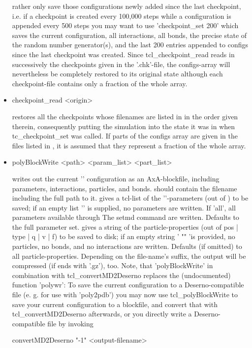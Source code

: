 \begin{itemize}
rather only save those configurations newly added since the last
checkpoint, i.e. if a checkpoint is created every 100,000 steps while
a configuration is appended every 500 steps you may want to use
'checkpoint\_set  200' which saves the current
configuration, all interactions, all bonds, the precise state of the
random number generator(s), and the last 200 entries appended to
configs since the last checkpoint was created. Since
tcl\_checkpoint\_read reads in successively the checkpoints given in
the '.chk'-file, the configs-array will nevertheless be completely
restored to its original state although each checkpoint-file contains
only a fraction of the whole array.
 \item
\begin{code}
checkpoint\_read <origin>
\end{code}

restores all the checkpoints whose filenames are listed in
 in the order given therein, consequently putting the
simulation into the state it was in when tc\_checkpoint\_set was
called. If parts of the configs array are given in the files listed in
, it is assumed that they represent a fraction of the
whole array.
 \item
\begin{code}
polyBlockWrite <path> <param\_list> <part\_list>
\end{code}
writes out the current '\es{}' configuration as an AxA-blockfile,
including parameters, interactions, particles, and bonds.  
should contain the filename including the full path to it.
 gives a tcl-list of the '\es{}'-parameters (out of )
to be saved; if an empty list '{}' is supplied, no parameters are
written. If 'all', all parameters available through The setmd command
are written. Defaults to the full parameter set.  
gives a string of the particle-properties (out of pos | type | q | v |
f) to be saved to disk; if an empty string ' "" 'is provided, no
particles, no bonds, and no interactions are written. Defaults (if
omitted) to all particle-properties.  Depending on the file-name's
suffix, the output will be compressed (if  ends with '.gz'),
too.  Note, that 'polyBlockWrite' in combination with
tcl\_convertMD2Deserno replaces the (undocumented) function 'polywr':
To save the current configuration to a Deserno-compatible file (e. g.
for use with 'poly2pdb') you may now use tcl\_polyBlockWrite to save
your current configuration to a blockfile, and convert that with
tcl\_convertMD2Deserno afterwards, or you directly write a
Deserno-compatible file by invoking
\begin{code}
convertMD2Deserno "-1" <output-filename>
\end{code}


\end{itemize}
